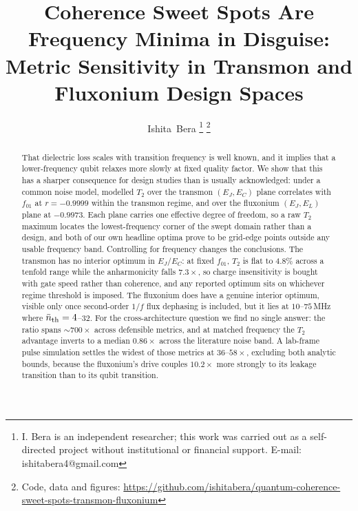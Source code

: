 \documentclass[journal]{IEEEtran}
\begin{document}
\title{Coherence Sweet Spots Are Frequency Minima in Disguise:\\
Metric Sensitivity in Transmon and Fluxonium Design Spaces}

\author{Ishita~Bera%
\thanks{I. Bera is an independent researcher; this work was carried out as a
self-directed project without institutional or financial support.
E-mail: ishitabera4@gmail.com}%
\thanks{Code, data and figures:
\url{https://github.com/ishitabera/quantum-coherence-sweet-spots-transmon-fluxonium}}}

\maketitle

\begin{abstract}
That dielectric loss scales with transition frequency is well known, and it implies that a
lower-frequency qubit relaxes more slowly at fixed quality factor. We show that this has a
sharper consequence for design studies than is usually acknowledged: under a common noise
model, modelled $T_2$ over the transmon $(E_J, E_C)$ plane correlates with $f_{01}$ at
$r = -0.9999$ within the transmon regime, and over the fluxonium $(E_J, E_L)$ plane at
$-0.9973$. Each plane carries one effective degree of freedom, so a raw $T_2$ maximum locates
the lowest-frequency corner of the swept domain rather than a design, and both of our own
headline optima prove to be grid-edge points outside any usable frequency band. Controlling
for frequency changes the conclusions. The transmon has no interior optimum in $E_J/E_C$: at
fixed $f_{01}$, $T_2$ is flat to 4.8\% across a tenfold range while the anharmonicity falls
$7.3\times$, so charge insensitivity is bought with gate speed rather than coherence, and any
reported optimum sits on whichever regime threshold is imposed. The fluxonium does have a
genuine interior optimum, visible only once second-order $1/f$ flux dephasing is included, but
it lies at $10$--$75$\,MHz where $\bar n_{\rm th} = 4$--$32$. For the cross-architecture
question we find no single answer: the ratio spans ${\sim}700\times$ across defensible metrics,
and at matched frequency the $T_2$ advantage inverts to a median $0.86\times$ across the
literature noise band. A lab-frame pulse simulation settles the widest of those metrics at
$36$--$58\times$, excluding both analytic bounds, because the fluxonium's drive couples
$10.2\times$ more strongly to its leakage transition than to its qubit transition.
\end{abstract}
\end{document}
